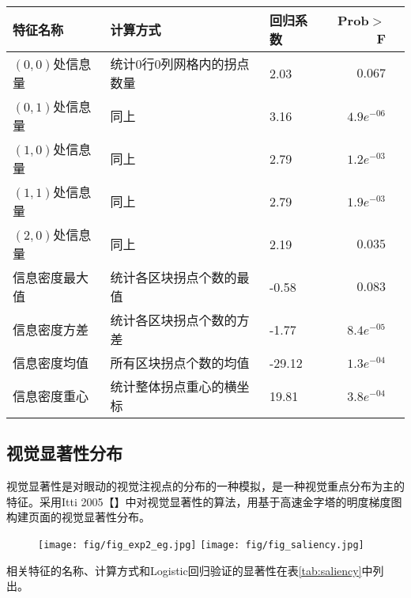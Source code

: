 \begin{table}[H]
  \centering
  \small
  \begin{tabular}{lllrr}
    \hline
     特征名称 & 计算方式 & 回归系数 & Prob$>$F \\
    \hline
    $(0, 0)$处信息量 & 统计0行0列网格内的拐点数量 & 2.03 & $0.067$\\
    $(0, 1)$处信息量 & 同上 & 3.16 & $4.9e^{-06}$\\
    $(1, 0)$处信息量 & 同上 & 2.79 & $1.2e^{-03}$\\
    $(1, 1)$处信息量 & 同上 & 2.79 & $1.9e^{-03}$\\
    $(2, 0)$处信息量 & 同上 & 2.19 & $0.035$\\
    信息密度最大值 & 统计各区块拐点个数的最值 & -0.58 & $0.083$\\
    信息密度方差 & 统计各区块拐点个数的方差 & -1.77 & $8.4e^{-05}$\\
    信息密度均值 & 所有区块拐点个数的均值 & -29.12 & $1.3e^{-04}$\\
    信息密度重心 & 统计整体拐点重心的横坐标 & 19.81 & $3.8e^{-04}$\\
    \hline
  \end{tabular}
\end{table}

\subsection{视觉显著性分布}
视觉显著性是对眼动的视觉注视点的分布的一种模拟，是一种视觉重点分布为主的特征。采用Itti 2005【】中对视觉显著性的算法，用基于高速金字塔的明度梯度图构建页面的视觉显著性分布。

\begin{figure}[H]
  \texttt{[image: fig/fig\_exp2\_eg.jpg]}
  \texttt{[image: fig/fig\_saliency.jpg]}
\end{figure}

相关特征的名称、计算方式和Logistic回归验证的显著性在表\ref{tab:saliency}中列出。


